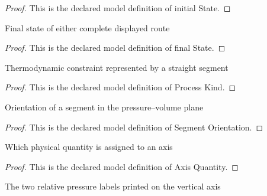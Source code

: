 \begin{proof}
  This is the declared model definition of initial State.
\end{proof}
\begin{definition}
  \label{def:physics:phyx-mini-0408:phyxminiproblems-problemphyxmini0408-processpath-finalstate}
  Final state of either complete displayed route
\end{definition}
\begin{proof}
  This is the declared model definition of final State.
\end{proof}
\begin{definition}
  \label{def:physics:phyx-mini-0408:phyxminiproblems-problemphyxmini0408-processkind}
  Thermodynamic constraint represented by a straight segment
\end{definition}
\begin{proof}
  This is the declared model definition of Process Kind.
\end{proof}
\begin{definition}
  \label{def:physics:phyx-mini-0408:phyxminiproblems-problemphyxmini0408-segmentorientation}
  Orientation of a segment in the pressure--volume plane
\end{definition}
\begin{proof}
  This is the declared model definition of Segment Orientation.
\end{proof}
\begin{definition}
  \label{def:physics:phyx-mini-0408:phyxminiproblems-problemphyxmini0408-axisquantity}
  Which physical quantity is assigned to an axis
\end{definition}
\begin{proof}
  This is the declared model definition of Axis Quantity.
\end{proof}
\begin{definition}
  \label{def:physics:phyx-mini-0408:phyxminiproblems-problemphyxmini0408-pressureaxislabel}
  The two relative pressure labels printed on the vertical axis
\end{definition}
